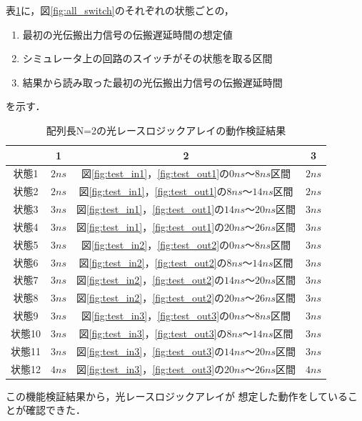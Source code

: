表\ref{test_timing}に，図\ref{fig:all_switch}のそれぞれの状態ごとの，
\begin{enumerate}
\item 最初の光伝搬出力信号の伝搬遅延時間の想定値
\item シミュレータ上の回路のスイッチがその状態を取る区間
\item 結果から読み取った最初の光伝搬出力信号の伝搬遅延時間
\end{enumerate}
を示す．
\begin{table}[t!]
\begin{center}
\caption{配列長N=2の光レースロジックアレイの動作検証結果}
\begin{tabular}{|c|c|c|c|} \hline
&1&2&3\\ \hline \hline
状態1&$2ns$&図\ref{fig:test_in1}，\ref{fig:test_out1}の$0ns〜8ns区間$&$2ns$\\ \hline
状態2&$2ns$&図\ref{fig:test_in1}，\ref{fig:test_out1}の$8ns〜14ns区間$&$2ns$\\ \hline
状態3&$3ns$&図\ref{fig:test_in1}，\ref{fig:test_out1}の$14ns〜20ns区間$&$3ns$\\ \hline
状態4&$3ns$&図\ref{fig:test_in1}，\ref{fig:test_out1}の$20ns〜26ns区間$&$3ns$\\ \hline
状態5&$3ns$&図\ref{fig:test_in2}，\ref{fig:test_out2}の$0ns〜8ns区間$&$3ns$\\ \hline
状態6&$3ns$&図\ref{fig:test_in2}，\ref{fig:test_out2}の$8ns〜14ns区間$&$3ns$\\ \hline
状態7&$3ns$&図\ref{fig:test_in2}，\ref{fig:test_out2}の$14ns〜20ns区間$&$3ns$\\ \hline
状態8&$3ns$&図\ref{fig:test_in2}，\ref{fig:test_out2}の$20ns〜26ns区間$&$3ns$\\ \hline
状態9&$3ns$&図\ref{fig:test_in3}，\ref{fig:test_out3}の$0ns〜8ns区間$&$3ns$\\ \hline
状態10&$3ns$&図\ref{fig:test_in3}，\ref{fig:test_out3}の$8ns〜14ns区間$&$3ns$\\ \hline
状態11&$3ns$&図\ref{fig:test_in3}，\ref{fig:test_out3}の$14ns〜20ns区間$&$3ns$\\ \hline
状態12&$4ns$&図\ref{fig:test_in3}，\ref{fig:test_out3}の$20ns〜26ns区間$&$4ns$\\ \hline
\end{tabular}
\label{test_timing}
\end{center}
\end{table}

この機能検証結果から，光レースロジックアレイが
想定した動作をしていることが確認できた．

